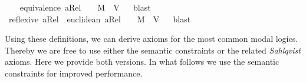 \begin{isabellebody}
{}
%
\endisatagproof
{\isafoldproof}%
%
\isadelimproof
%
\endisadelimproof
\isanewline
\ \ \isamarkupfalse%
\ {\isachardoublequoteopen}equivalence\ aRel\ \ {\isasymLongrightarrow}\ \ {\isasymlfloor}M{\isasymrfloor}\ {\isasymand}\ {\isasymlfloor}V{\isasymrfloor}{\isachardoublequoteclose}%
\isadelimproof
\ %
\endisadelimproof
%
\isatagproof
{}\isamarkupfalse%
\ blast\ %
%
\endisatagproof
{\isafoldproof}%
%
\isadelimproof
%
\endisadelimproof
\isanewline
\ \ \isamarkupfalse%
\ {\isachardoublequoteopen}reflexive\ aRel\ {\isasymand}\ euclidean\ aRel\ \ {\isasymLongrightarrow}\ \ {\isasymlfloor}M{\isasymrfloor}\ {\isasymand}\ {\isasymlfloor}V{\isasymrfloor}{\isachardoublequoteclose}%
\isadelimproof
\ %
\endisadelimproof
%
\isatagproof
{}\isamarkupfalse%
\ blast\ %
%
\endisatagproof
{\isafoldproof}%
%
\isadelimproof
%
\endisadelimproof
%
\begin{isamarkuptext}%
Using these definitions, we can derive axioms for the most common modal logics. Thereby we 
  are free to use either the semantic constraints or the related \emph{Sahlqvist} axioms. Here we provide 
  both versions. In what follows we use the semantic constraints for improved performance.%
\end{isamarkuptext}\isamarkuptrue%
%
\isadelimtheory
%
\endisadelimtheory
%
\isatagtheory
%
\endisatagtheory
{\isafoldtheory}%
%
\isadelimtheory
%
\endisadelimtheory
%
\end{isabellebody}%
